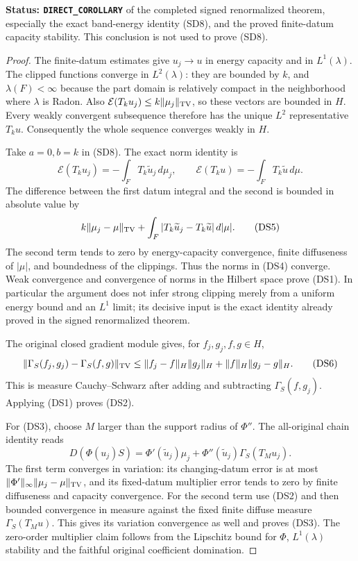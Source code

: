\documentclass[11pt,a4paper]{article}
\numberwithin{equation}{section}
\theoremstyle{definition}
\theoremstyle{remark}
\begin{document}
\noindent\textbf{Status: \texttt{DIRECT\_COROLLARY}} of
the completed signed renormalized theorem, especially the exact
band-energy identity (SD8), and the proved finite-datum capacity
stability.  This conclusion is not used to prove (SD8).

\begin{proof}
The finite-datum estimates give $u_j\to u$ in energy capacity
and in $L^1(\lambda)$.  The clipped functions converge in
$L^2(\lambda)$: they are bounded by $k$, and $\lambda(F)<\infty$
because the part domain is relatively compact in the neighborhood
where $\lambda$ is Radon.  Also
$\mathcal E(T_ku_j)\leq k\|\mu_j\|_{\rm TV}$, so these
vectors are bounded in $H$.  Every weakly convergent subsequence
therefore has the unique $L^2$ representative $T_ku$.
Consequently the whole sequence converges weakly in $H$.

Take $a=0,b=k$ in (SD8).  The exact norm identity is
\[
 \mathcal E(T_ku_j)=-\int_F T_k\widetilde u_j\,d\mu_j,
 \qquad
 \mathcal E(T_ku)=-\int_F T_k\widetilde u\,d\mu.
 \tag{DS4}
\]
The difference between the first datum integral and the second
is bounded in absolute value by
\[
 k\|\mu_j-\mu\|_{\rm TV}
       +\int_F|T_k\widetilde u_j-T_k\widetilde u|\,d|\mu|.
 \tag{DS5}
\]
The second term tends to zero by energy-capacity convergence,
finite diffuseness of $|\mu|$, and boundedness of the clippings.
Thus the norms in (DS4) converge.  Weak convergence and convergence
of norms in the Hilbert space prove (DS1).  In particular the
argument does not infer strong clipping merely from a uniform
energy bound and an $L^1$ limit; its decisive input is the exact
identity already proved in the signed renormalized theorem.

The original closed gradient module gives, for $f_j,g_j,f,g\in H$,
\[
 \|\Gamma_S(f_j,g_j)-\Gamma_S(f,g)\|_{\rm TV}
  \leq \|f_j-f\|_H\|g_j\|_H
                         +\|f\|_H\|g_j-g\|_H.
 \tag{DS6}
\]
This is measure Cauchy--Schwarz after adding and subtracting
$\Gamma_S(f,g_j)$.  Applying (DS1) proves (DS2).

For (DS3), choose $M$ larger than the support radius of $\Phi''$.
The all-original chain identity reads
\[
 D(\Phi(u_j)S)=\Phi'(\widetilde u_j)\mu_j
       +\Phi''(\widetilde u_j)\Gamma_S(T_Mu_j).
 \tag{DS7}
\]
The first term converges in variation: its changing-datum error
is at most $\|\Phi'\|_\infty\|\mu_j-\mu\|_{\rm TV}$,
and its fixed-datum multiplier error tends to zero by finite
diffuseness and capacity convergence.  For the second term use
(DS2) and then bounded convergence in measure against the fixed
finite diffuse measure $\Gamma_S(T_Mu)$.  This gives its variation
convergence as well and proves (DS3).  The zero-order multiplier
claim follows from the Lipschitz bound for $\Phi$, $L^1(\lambda)$
stability and the faithful original coefficient domination.


\end{proof}
\end{document}

